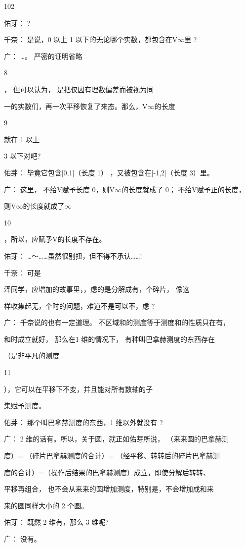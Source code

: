 102\par
佑芽： ?\par
千奈： 是说，0 以上 1 以下的无论哪个实数，都包含在V$\infty$里 ?\par
广： …。 严密的证明省略\par
8\par
， 但可以认为， 是把仅因有理数偏差而被视为同\par
一的实数们，再一次平移恢复了来态。那么，V$\infty$的长度\par
9\par
就在 1 以上\par
3 以下对吧?\par
佑芽： 毕竟它包含[0,1]（长度 1） ，又被包含在[-1,2]（长度 3）里。\par
广： 这里， 不给V赋予长度 0，则V$\infty$的长度就成了 0； 不给V赋予正的长度，\par
则V$\infty$的长度就成了$\infty$\par
10\par
，所以，应赋予V的长度不存在。\par
佑芽： …～……虽然很别扭，但不得不承认……!\par
千奈： 可是\par
泽同学，应增加的故事里，，虑的是分解成有，个碎片， 像这\par
样收集起无，个时的问题，难道不是可以不，虑 ?\par
广： 千奈说的也有一定道理。 不区域和的测度等于测度和的性质只在有，\par
和时成立就好， 那么在1 维的情况下， 有种叫巴拿赫测度的东西存在\par
（是非平凡的测度\par
11\par
），它可以在平移下不变，并且能对所有数轴的子\par
集赋予测度。\par
佑芽： 那个叫巴拿赫测度的东西，1 维以外就没有 ?\par
广： 2 维的话有。所以，关于圆，就正如佑芽所说， （来来圆的巴拿赫测\par
度）= （碎片巴拿赫测度的合计）= （经平移、转转后的碎片巴拿赫测\par
度的合计）=（操作后结果的巴拿赫测度）成立，即使分解后转转、\par
平移再组合， 也不会从来来的圆增加测度，特别是，不会增加成和来\par
来的圆同样大小的 2 个圆。\par
佑芽： 既然 2 维有，那么 3 维呢?\par
广： 没有。\par
